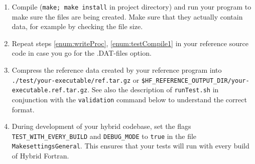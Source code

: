 \begin{enumerate}
  \item \label{enum:testCompile1} Compile (\verb|make; make install| in project directory) and run your program to make sure the files are being created. Make sure that they actually contain data, for example by checking the file size.
  \item Repeat steps \ref{enum:writeProc}, \ref{enum:testCompile1} in your reference source code in case you go for the .DAT-files option.
  \item Compress the reference data created by your reference program into \linebreak\verb|./test/your-executable/ref.tar.gz| or \linebreak\verb|$HF_REFERENCE_OUTPUT_DIR/your-executable.ref.tar.gz|. See also the description of \verb|runTest.sh| in conjunction with the \verb|validation| command below to understand the correct format.
  \item During development of your hybrid codebase, set the flags \verb|TEST_WITH_EVERY_BUILD| and \verb|DEBUG_MODE| to \verb|true| in the file \verb|MakesettingsGeneral|. This ensures that your tests will run with every build of Hybrid Fortran.
\end{enumerate}

